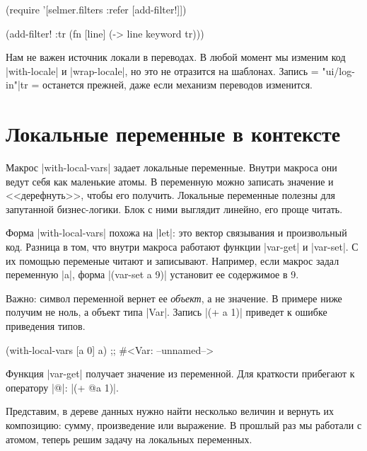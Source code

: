 \begin{english}
  \begin{clojure}
(require '[selmer.filters :refer [add-filter!]])

(add-filter! :tr
 (fn [line]
   (-> line keyword tr)))
  \end{clojure}
\end{english}

Нам не важен источник локали в переводах. В любой момент мы изменим код
\spverb|with-locale| и \spverb|wrap-locale|, но это не отразится на
шаблонах. Запись \spverb={{ "ui/log-in"|tr }}= останется прежней, даже если
механизм переводов изменится.

\section{Локальные переменные в контексте}

Макрос \spverb|with-local-vars| задает локальные переменные. Внутри макроса они
ведут себя как маленькие атомы. В переменную можно записать значение и
<<дерефнуть>>, чтобы его получить. Локальные переменные полезны для запутанной
бизнес-логики. Блок с ними выглядит линейно, его проще читать.

Форма \spverb|with-local-vars| похожа на \spverb|let|: это вектор связывания и
произвольный код. Разница в том, что внутри макроса работают функции
\spverb|var-get| и \spverb|var-set|. С их помощью переменые читают и
записывают. Например, если макрос задал переменную \spverb|a|, форма
\spverb|(var-set a 9)| установит ее содержимое в 9.

Важно: символ переменной вернет ее \emph{объект}, а не значение. В примере ниже
получим не ноль, а объект типа \spverb|Var|. Запись \spverb|(+ a 1)| приведет к
ошибке приведения типов.

\begin{english}
  \begin{clojure}
(with-local-vars [a 0] a)
;; #<Var: --unnamed-->
  \end{clojure}
\end{english}

Функция \spverb|var-get| получает значение из переменной. Для краткости
прибегают к оператору \spverb|@|: \spverb|(+ @a 1)|.

Представим, в дереве данных нужно найти несколько величин и вернуть их
композицию: сумму, произведение или выражение. В прошлый раз мы работали с
атомом, теперь решим задачу на локальных переменных.

